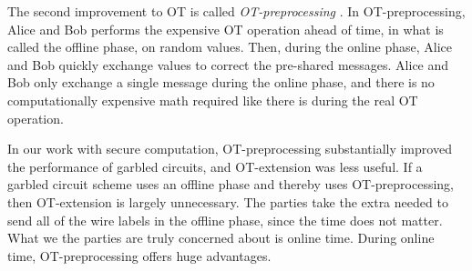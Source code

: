 The second improvement to OT is called \textit{OT-preprocessing} \cite{Bea95}.
In OT-preprocessing, Alice and Bob performs the expensive OT operation ahead of time, in what is called the offline phase, on random values.
Then, during the online phase, Alice and Bob quickly exchange values to correct the pre-shared messages.
Alice and Bob only exchange a single message during the online phase, and there is no computationally expensive math required like there is during the real OT operation.

In our work with secure computation, OT-preprocessing substantially improved the performance of garbled circuits, and OT-extension was less useful.
If a garbled circuit scheme uses an offline phase and thereby uses OT-preprocessing, then OT-extension is largely unnecessary.
The parties take the extra needed to send all of the wire labels in the offline phase, since the time does not matter.
What we the parties are truly concerned about is online time.
During online time, OT-preprocessing offers huge advantages.

